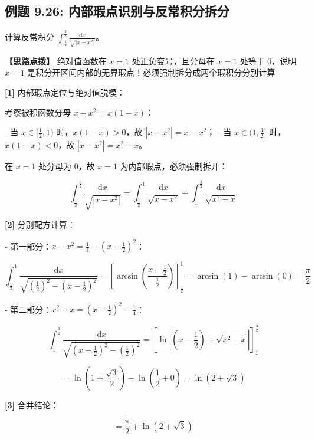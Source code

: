 \documentclass[11pt,a4paper,UTF8]{ctexart}
\begin{document}
\subsection{例题 9.26: 内部瑕点识别与反常积分拆分}

计算反常积分 $\int_{\frac{1}{2}}^{\frac{3}{2}} \frac{\mathrm{d}x}{\sqrt{|x-x^2|}}$。

\textbf{\color{DeepPurple}【思路点拨】} 绝对值函数在 $x=1$ 处正负变号，且分母在 $x=1$ 处等于 0，说明 $x=1$ 是积分开区间内部的无界瑕点！必须强制拆分成两个瑕积分分别计算


\begin{solbox}[分步推导与答题规范]
\textbf{[1]} 内部瑕点定位与绝对值脱模：

考察被积函数分母 $x - x^2 = x(1-x)$：

- 当 $x \in [\frac{1}{2}, 1)$ 时，$x(1-x) > 0$，故 $|x-x^2| = x-x^2$；
- 当 $x \in (1, \frac{3}{2}]$ 时，$x(1-x) < 0$，故 $|x-x^2| = x^2-x$。

在 $x=1$ 处分母为 0，故 $x=1$ 为内部瑕点，必须强制拆开：


\begin{equation*}
\int_{\frac{1}{2}}^{\frac{3}{2}} \frac{\mathrm{d}x}{\sqrt{|x-x^2|}} = \int_{\frac{1}{2}}^1 \frac{\mathrm{d}x}{\sqrt{x-x^2}} + \int_1^{\frac{3}{2}} \frac{\mathrm{d}x}{\sqrt{x^2-x}}
\end{equation*}


\textbf{[2]} 分别配方计算：

- 第一部分：$x - x^2 = \frac{1}{4} - (x - \frac{1}{2})^2$：


\begin{equation*}
\int_{\frac{1}{2}}^1 \frac{\mathrm{d}x}{\sqrt{\left(\frac{1}{2}\right)^2 - \left(x-\frac{1}{2}\right)^2}} = \left[ \arcsin\left(\frac{x-\frac{1}{2}}{\frac{1}{2}}\right) \right]_{\frac{1}{2}}^1 = \arcsin(1) - \arcsin(0) = \frac{\pi}{2}
\end{equation*}


- 第二部分：$x^2 - x = (x - \frac{1}{2})^2 - \frac{1}{4}$：


\begin{equation*}
\int_1^{\frac{3}{2}} \frac{\mathrm{d}x}{\sqrt{\left(x-\frac{1}{2}\right)^2 - \left(\frac{1}{2}\right)^2}} = \left[ \ln\left| \left(x-\frac{1}{2}\right) + \sqrt{x^2-x} \right| \right]_1^{\frac{3}{2}}
\end{equation*}



\begin{equation*}
= \ln\left( 1 + \frac{\sqrt{3}}{2} \right) - \ln\left( \frac{1}{2} + 0 \right) = \ln(2 + \sqrt{3})
\end{equation*}


\textbf{[3]} 合并结论：


\begin{equation*}
= \frac{\pi}{2} + \ln(2+\sqrt{3})
\end{equation*}

\end{solbox}
\end{document}
